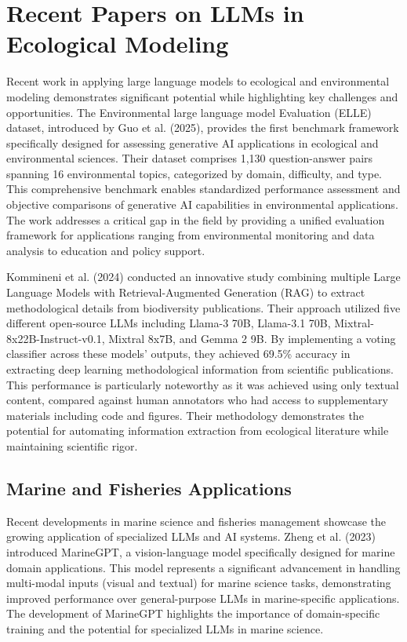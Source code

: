 \section*{Recent Papers on LLMs in Ecological Modeling}

Recent work in applying large language models to ecological and environmental modeling demonstrates significant potential while highlighting key challenges and opportunities. The Environmental large language model Evaluation (ELLE) dataset, introduced by Guo et al. (2025), provides the first benchmark framework specifically designed for assessing generative AI applications in ecological and environmental sciences. Their dataset comprises 1,130 question-answer pairs spanning 16 environmental topics, categorized by domain, difficulty, and type. This comprehensive benchmark enables standardized performance assessment and objective comparisons of generative AI capabilities in environmental applications. The work addresses a critical gap in the field by providing a unified evaluation framework for applications ranging from environmental monitoring and data analysis to education and policy support.

Kommineni et al. (2024) conducted an innovative study combining multiple Large Language Models with Retrieval-Augmented Generation (RAG) to extract methodological details from biodiversity publications. Their approach utilized five different open-source LLMs including Llama-3 70B, Llama-3.1 70B, Mixtral-8x22B-Instruct-v0.1, Mixtral 8x7B, and Gemma 2 9B. By implementing a voting classifier across these models' outputs, they achieved 69.5\% accuracy in extracting deep learning methodological information from scientific publications. This performance is particularly noteworthy as it was achieved using only textual content, compared against human annotators who had access to supplementary materials including code and figures. Their methodology demonstrates the potential for automating information extraction from ecological literature while maintaining scientific rigor.

\subsection*{Marine and Fisheries Applications}

Recent developments in marine science and fisheries management showcase the growing application of specialized LLMs and AI systems. Zheng et al. (2023) introduced MarineGPT, a vision-language model specifically designed for marine domain applications. This model represents a significant advancement in handling multi-modal inputs (visual and textual) for marine science tasks, demonstrating improved performance over general-purpose LLMs in marine-specific applications. The development of MarineGPT highlights the importance of domain-specific training and the potential for specialized LLMs in marine science.

